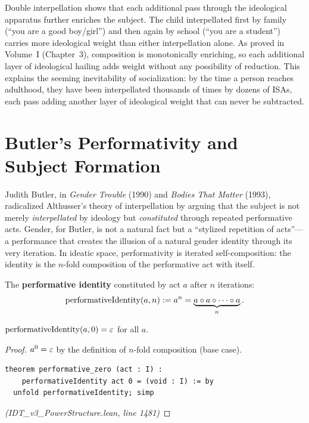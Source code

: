 \begin{interpretation}
Double interpellation shows that each additional pass through the ideological
apparatus further enriches the subject. The child interpellated first by
family (``you are a good boy/girl'') and then again by school (``you are a
student'') carries more ideological weight than either interpellation alone.
As proved in Volume~I (Chapter~3), composition is monotonically enriching,
so each additional layer of ideological hailing adds weight without any
possibility of reduction. This explains the seeming inevitability of
socialization: by the time a person reaches adulthood, they have been
interpellated thousands of times by dozens of ISAs, each pass adding
another layer of ideological weight that can never be subtracted.
\end{interpretation}

\section{Butler's Performativity and Subject Formation}

Judith Butler, in \emph{Gender Trouble} (1990) and \emph{Bodies That Matter}
(1993), radicalized Althusser's theory of interpellation by arguing that the
subject is not merely \emph{interpellated} by ideology but \emph{constituted}
through repeated performative acts. Gender, for Butler, is not a natural fact
but a ``stylized repetition of acts''---a performance that creates the illusion
of a natural gender identity through its very iteration. In ideatic space,
performativity is iterated self-composition: the identity is the $n$-fold
composition of the performative act with itself.

\begin{definition}
\label{def:performative-identity}
The \textbf{performative identity} constituted by act $a$ after $n$ iterations:
\[
  \mathrm{performativeIdentity}(a, n) := a^n = \underbrace{a \circ a \circ \cdots \circ a}_{n}.
\]
\end{definition}

\begin{theorem}
\label{thm:performative-zero}
$\mathrm{performativeIdentity}(a, 0) = \varepsilon$ for all $a$.
\end{theorem}

\begin{proof}
$a^0 = \varepsilon$ by the definition of $n$-fold composition (base case).
\begin{lstlisting}
theorem performative_zero (act : I) :
    performativeIdentity act 0 = (void : I) := by
  unfold performativeIdentity; simp
\end{lstlisting}
\textit{(IDT\_v3\_PowerStructure.lean, line 1481)}
\end{proof}

